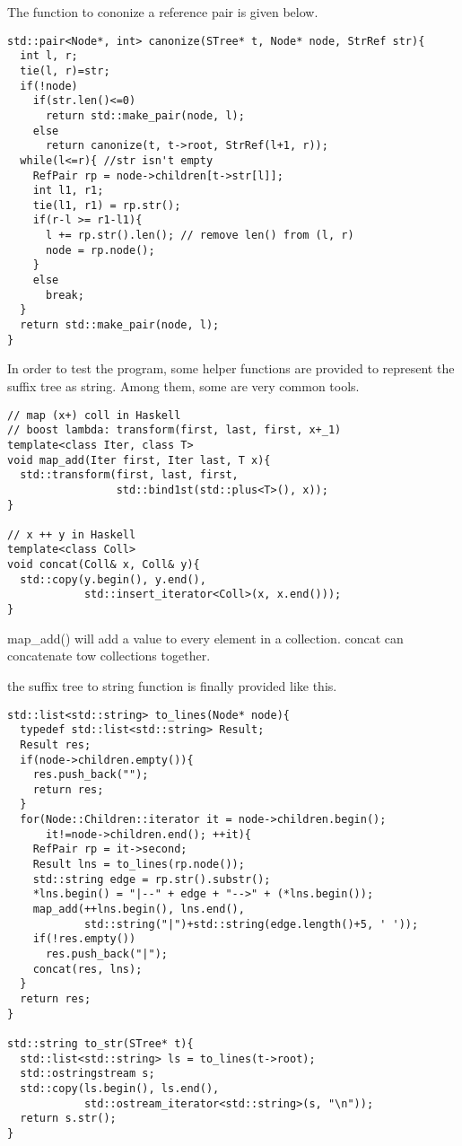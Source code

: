 \documentclass{article}
\begin{document}
The function to cononize a reference pair is given below.

\begin{lstlisting}
std::pair<Node*, int> canonize(STree* t, Node* node, StrRef str){
  int l, r;
  tie(l, r)=str;
  if(!node)
    if(str.len()<=0)
      return std::make_pair(node, l);
    else
      return canonize(t, t->root, StrRef(l+1, r));
  while(l<=r){ //str isn't empty
    RefPair rp = node->children[t->str[l]];
    int l1, r1;
    tie(l1, r1) = rp.str();
    if(r-l >= r1-l1){
      l += rp.str().len(); // remove len() from (l, r)
      node = rp.node();
    }
    else
      break;
  }
  return std::make_pair(node, l);
}
\end{lstlisting}

In order to test the program, some helper functions are provided
to represent the suffix tree as string. Among them, some are very
common tools.

\begin{lstlisting}
// map (x+) coll in Haskell
// boost lambda: transform(first, last, first, x+_1)
template<class Iter, class T>
void map_add(Iter first, Iter last, T x){
  std::transform(first, last, first, 
                 std::bind1st(std::plus<T>(), x));
}

// x ++ y in Haskell
template<class Coll>
void concat(Coll& x, Coll& y){
  std::copy(y.begin(), y.end(), 
            std::insert_iterator<Coll>(x, x.end()));
}
\end{lstlisting}

map\_add() will add a value to every element in a collection.
concat can concatenate tow collections together.

the suffix tree to string function is finally provided like this.

\begin{lstlisting}
std::list<std::string> to_lines(Node* node){
  typedef std::list<std::string> Result;
  Result res;
  if(node->children.empty()){
    res.push_back("");
    return res;
  }
  for(Node::Children::iterator it = node->children.begin();
      it!=node->children.end(); ++it){
    RefPair rp = it->second;
    Result lns = to_lines(rp.node());
    std::string edge = rp.str().substr();
    *lns.begin() = "|--" + edge + "-->" + (*lns.begin());
    map_add(++lns.begin(), lns.end(), 
            std::string("|")+std::string(edge.length()+5, ' '));
    if(!res.empty())
      res.push_back("|");
    concat(res, lns);
  }
  return res;
}

std::string to_str(STree* t){
  std::list<std::string> ls = to_lines(t->root);
  std::ostringstream s;
  std::copy(ls.begin(), ls.end(), 
            std::ostream_iterator<std::string>(s, "\n"));
  return s.str();
}
\end{lstlisting}
\end{document}
